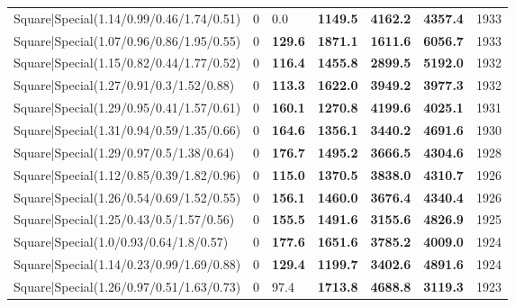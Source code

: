 \begin{tabular}{lrllllr}
 Square|Special(1.14/0.99/0.46/1.74/0.51)                      &             0   & 0.0            & \textbf{1149.5} & \textbf{4162.2} & \textbf{4357.4} &         1933 \\
 Square|Special(1.07/0.96/0.86/1.95/0.55)                      &             0   & \textbf{129.6} & \textbf{1871.1} & \textbf{1611.6} & \textbf{6056.7} &         1933 \\
 Square|Special(1.15/0.82/0.44/1.77/0.52)                      &             0   & \textbf{116.4} & \textbf{1455.8} & \textbf{2899.5} & \textbf{5192.0} &         1932 \\
 Square|Special(1.27/0.91/0.3/1.52/0.88)                       &             0   & \textbf{113.3} & \textbf{1622.0} & \textbf{3949.2} & \textbf{3977.3} &         1932 \\
 Square|Special(1.29/0.95/0.41/1.57/0.61)                      &             0   & \textbf{160.1} & \textbf{1270.8} & \textbf{4199.6} & \textbf{4025.1} &         1931 \\
 Square|Special(1.31/0.94/0.59/1.35/0.66)                      &             0   & \textbf{164.6} & \textbf{1356.1} & \textbf{3440.2} & \textbf{4691.6} &         1930 \\
 Square|Special(1.29/0.97/0.5/1.38/0.64)                       &             0   & \textbf{176.7} & \textbf{1495.2} & \textbf{3666.5} & \textbf{4304.6} &         1928 \\
 Square|Special(1.12/0.85/0.39/1.82/0.96)                      &             0   & \textbf{115.0} & \textbf{1370.5} & \textbf{3838.0} & \textbf{4310.7} &         1926 \\
 Square|Special(1.26/0.54/0.69/1.52/0.55)                      &             0   & \textbf{156.1} & \textbf{1460.0} & \textbf{3676.4} & \textbf{4340.4} &         1926 \\
 Square|Special(1.25/0.43/0.5/1.57/0.56)                       &             0   & \textbf{155.5} & \textbf{1491.6} & \textbf{3155.6} & \textbf{4826.9} &         1925 \\
 Square|Special(1.0/0.93/0.64/1.8/0.57)                        &             0   & \textbf{177.6} & \textbf{1651.6} & \textbf{3785.2} & \textbf{4009.0} &         1924 \\
 Square|Special(1.14/0.23/0.99/1.69/0.88)                      &             0   & \textbf{129.4} & \textbf{1199.7} & \textbf{3402.6} & \textbf{4891.6} &         1924 \\
 Square|Special(1.26/0.97/0.51/1.63/0.73)                      &             0   & 97.4           & \textbf{1713.8} & \textbf{4688.8} & \textbf{3119.3} &         1923 \\

\end{tabular}
